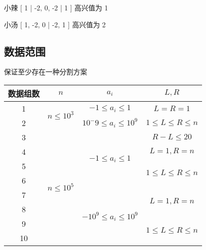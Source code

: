 \documentclass[UTF8]{ctexart}
\begin{document}
小辣 [ 1 | -2, 0, -2 | 1 ] 高兴值为 1

小汤 [ 1, -2, 0 | -2, 1 ] 高兴值为 2


\subsection{数据范围}

保证至少存在一种分割方案

\begin{tabular}{|c|c|c|c|}
\hline
数据组数 & $n$                            & $a_i$                                      & $L,R$                                     \\ \hline
1    & \multirow{2}{*}{$n \leq 10^3$} & $-1\leq a_i \leq 1$                        & $L=R=1$                                   \\ \cline{1-1} \cline{3-4} 
2    &                                & $10^-9 \leq a_i \leq 10^9$                 & $1 \leq L \leq R \leq n$                  \\ \hline
3    & \multirow{8}{*}{$n \leq 10^5$} & \multirow{4}{*}{$-1\leq a_i \leq 1$}       & $R-L \leq 20$                             \\ \cline{1-1} \cline{4-4} 
4    &                                &                                            & $L=1,R=n$                                 \\ \cline{1-1} \cline{4-4} 
5    &                                &                                            & \multirow{2}{*}{$1 \leq L \leq R \leq n$} \\ \cline{1-1}
6    &                                &                                            &                                           \\ \cline{1-1} \cline{3-4} 
7    &                                & \multirow{4}{*}{$-10^9 \leq a_i\leq 10^9$} & \multirow{2}{*}{$L=1,R=n$}                \\ \cline{1-1}
8    &                                &                                            &                                           \\ \cline{1-1} \cline{4-4} 
9    &                                &                                            & \multirow{2}{*}{$1 \leq L \leq R \leq n$} \\ \cline{1-1}
10   &                                &                                            &                                           \\ \hline
\end{tabular}
\end{document}
